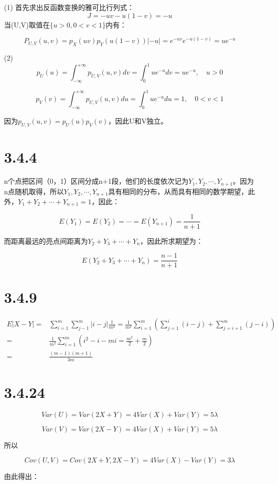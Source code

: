 \documentclass{article}
\begin{document}
(1)
首先求出反函数变换的雅可比行列式：
$$J=-uv-u(1-v)=-u$$
当(U,V)取值在$\{u>0,0<v<1\}$内有：

$$P_{U,V}(u,v)=p_X(uv)p_Y(u(1-v))|-u|=e^{-uv}e^{-u(1-v)}=ue^{-u}$$

(2)
$$p_U(u)=\int^{+\infty}_{-\infty}p_{U,V}(u,v)dv=\int^{1}_0ue^{-u}dv=ue^{-u},\quad u>0$$

$$p_V(v)=\int^{+\infty}_{-\infty}p_{U,V}(u,v)du=\int^{1}_0ue^{-u}du=1,\quad 0<v<1$$


因为$p_{U,V}(u,v)=p_U(u)p_V(v)$，因此U和V独立。


\section{3.4.4}
n个点把区间（0，1）区间分成n+1段，他们的长度依次记为$Y_1,Y_2,\cdots,Y_{n+1}$。因为n点随机取得，所以$Y_1,Y_2,\cdots,Y_{n+1}$具有相同的分布，从而具有相同的数学期望，此外，$Y_1+Y_2+\cdots+Y_{n+1}=1$，因此：

$$E(Y_1)=E(Y_2)=\cdots=E(Y_{n+1})=\frac1{n+1}$$

而距离最远的亮点间距离为$Y_2+Y_3+\cdots+Y_{n}$，因此所求期望为：

$$E(Y_2+Y_3+\cdots+Y_{n})=\frac{n-1}{n+1}$$


\section{3.4.9}


\begin{equation}
\begin{aligned}
E|X-Y|=&\sum^m_{i=1}\sum^m_{j-1}|i-j|\frac{1}{m^2}=\frac1{m^2}\sum^m_{i=1}(\sum^i_{j=1}(i-j)+\sum^m_{j=i+1}(j-i))\\
=&\frac1{m^2}\sum^m_{i=1}(i^2-i-mi=\frac{m^2}2+\frac m2)\\
=&\frac{(m-1)(m+1)}{3m}
\end{aligned}
\end{equation}


\section{3.4.24}

$$Var(U)=Var(2X+Y)=4Var(X)+Var(Y)=5\lambda$$

$$Var(V)=Var(2X-Y)=4Var(X)+Var(Y)=5\lambda$$

所以

$$Cov(U,V)=Cov(2X+Y,2X-Y)=4Var(X)-Var(Y)=3\lambda$$

由此得出：
\end{document}
